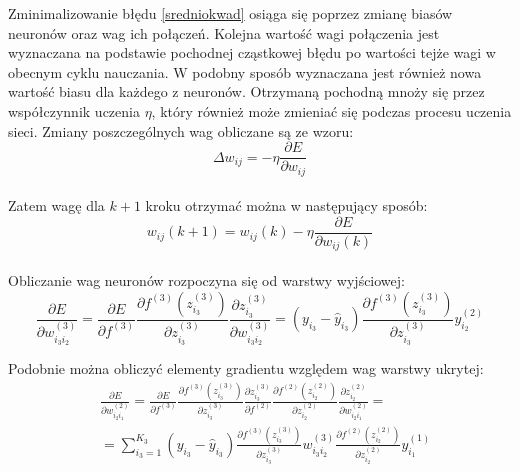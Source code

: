 \documentclass[12pt,twoside]{article}
\begin{document}
Zminimalizowanie błędu \ref{sredniokwad} osiąga się poprzez zmianę biasów neuronów oraz wag ich połączeń. Kolejna wartość wagi połączenia jest wyznaczana na podstawie pochodnej cząstkowej błędu po wartości tejże wagi w obecnym cyklu nauczania. W podobny sposób wyznaczana jest również nowa wartość biasu dla każdego z neuronów. Otrzymaną pochodną mnoży się przez współczynnik uczenia $\eta$, który również może zmieniać się podczas procesu uczenia sieci. Zmiany poszczególnych wag obliczane są ze wzoru:\\
\begin{equation}
\Delta w_{ij} = - \eta \frac{\partial E}{\partial w_{ij}}
\end{equation}\\

Zatem wagę dla $k+1$ kroku otrzymać można w następujący sposób:\\
\begin{equation}
w_{ij}(k+1) = w_{ij}(k) - \eta \frac{\partial E}{\partial w_{ij}(k)}
\end{equation}\\

Obliczanie wag neuronów rozpoczyna się od warstwy wyjściowej:\\
\begin{equation}
\frac{\partial E}{\partial w_{i_{3}i_{2}}^{(3)}} = \frac{\partial E}{\partial f^{(3)}} \frac{\partial f^{(3)}\left( z_{i_{3}}^{(3)} \right)}{\partial z_{i_{3}}^{(3)}} \frac{\partial z_{i_{3}}^{(3)}}{\partial w_{i_{3}i_{2}}^{(3)}} = \left( y_{i_{3}} - \hat{y}_{i_{3}} \right) \frac{\partial f^{(3)}\left( z_{i_{3}}^{(3)} \right)}{\partial z_{i_{3}}^{(3)}} y_{i_{2}}^{(2)}
\end{equation}

Podobnie można obliczyć elementy gradientu względem wag warstwy ukrytej:\\
\begin{equation}
\begin{aligned}
&\frac{\partial E}{\partial w_{i_{2}i_{1}}^{(2)}} = \frac{\partial E}{\partial f^{(3)}} \frac{\partial f^{(3)}\left( z_{i_{3}}^{(3)} \right)}{\partial z_{i_{3}}^{(3)}} \frac{\partial z_{i_{3}}^{(3)}}{\partial f^{(2)}} \frac{\partial f^{(2)}\left( z_{i_{2}}^{(2)} \right)}{\partial z_{i_{2}}^{(2)}} \frac{\partial z_{i_{2}}^{(2)}}{\partial w_{i_{2}i_{1}}^{(2)}}  =\\
&= \sum_{i_{3}=1}^{K_3}\left( y_{i_{3}} - \hat{y}_{i_{3}} \right) \frac{\partial f^{(3)}\left( z_{i_{3}}^{(3)} \right)}{\partial z_{i_{3}}^{(3)}} w_{i_{3}i_{2}}^{(3)} \frac{\partial f^{(2)}\left( z_{i_{2}}^{(2)} \right)}{\partial z_{i_{2}}^{(2)}} y_{i_{1}}^{(1)}
\end{aligned}
\end{equation}\\
\end{document}
